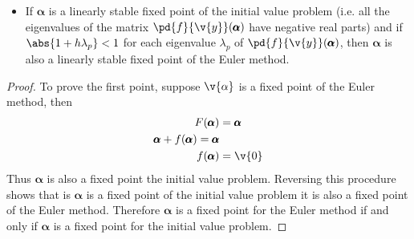 \documentclass[11pt]{article}
\begin{document}
\begin{enumerate}
\begin{enumerate}
\begin{itemize}
                    \item 
                        If $\pmb{\alpha}$ is a linearly stable fixed point of the
                        initial value problem (i.e. all the eigenvalues of the matrix
                        $\pd{f}{\v{y}}(\pmb{\alpha})$ have negative real parts) and if
                        $\abs{1 + h \lambda_p} < 1$ for each eigenvalue
                        $\lambda_p$ of $\pd{f}{\v{y}}(\pmb{\alpha})$, then
                        $\pmb{\alpha}$ is also a linearly stable fixed point of
                        the Euler method.
                \end{itemize}

                \begin{proof}
                    To prove the first point, suppose $\v{\alpha}$ is a fixed point
                    of the Euler method, then
                    \begin{align*}
                        F(\pmb{\alpha}) &= \pmb{\alpha} \\
                        \pmb{\alpha} + f(\pmb{\alpha}) =  \pmb{\alpha} \\
                        f(\pmb{\alpha}) &= \v{0}
                    \end{align*}
                    Thus $\pmb{\alpha}$ is also a fixed point the initial value
                    problem.
                    Reversing this procedure shows that is $\pmb{\alpha}$ is
                    a fixed point of the initial value problem it is also
                    a fixed point of the Euler method.
                    Therefore $\pmb{\alpha}$ is a fixed point for the Euler method
                    if and only if $\pmb{\alpha}$ is a fixed point for the initial
                    value problem.


\end{proof}
\end{enumerate}
\end{enumerate}
\end{document}

